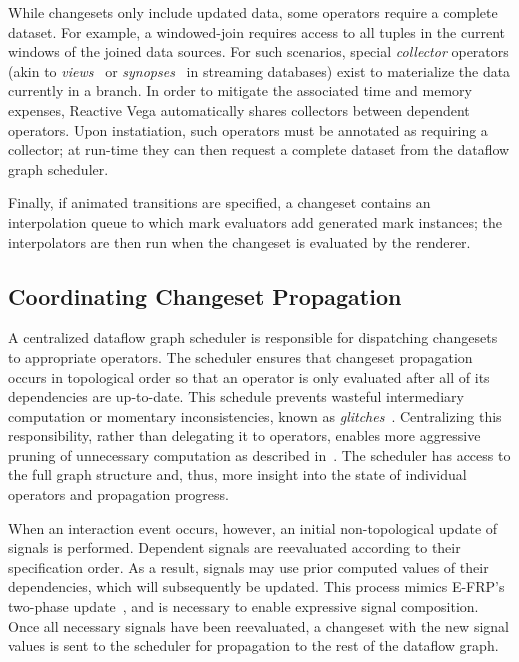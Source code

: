 While changesets only include updated data, some operators require a complete
dataset. For example, a windowed-join requires access to all tuples in the
current windows of the joined data sources. For such scenarios, special
\emph{collector} operators (akin to \emph{views}~\cite{abadi:aurora} or
\emph{synopses}~\cite{arasu:stream} in streaming databases) exist to
materialize the data currently in a branch. In order to mitigate the
associated time and memory expenses, Reactive Vega automatically shares
collectors between dependent operators. Upon instatiation, such operators must
be annotated as requiring a collector; at run-time they can then request a
complete dataset from the dataflow graph scheduler.

Finally, if animated transitions are specified, a changeset contains an
interpolation queue to which mark evaluators add generated mark instances; the
interpolators are then run when the changeset is evaluated by the renderer.

\subsection{Coordinating Changeset Propagation}
\label{sec:propagation}

A centralized dataflow graph scheduler is responsible for dispatching changesets
to appropriate operators. The scheduler ensures that changeset propagation
occurs in topological order so that an operator is only evaluated after all of
its dependencies are up-to-date. This schedule prevents wasteful intermediary
computation or momentary inconsistencies, known as
\emph{glitches}~\cite{cooper:embedding}. Centralizing this responsibility,
rather than delegating it to operators, enables more aggressive pruning of
unnecessary computation as described in~. The scheduler has
access to the full graph structure and, thus, more insight into the state of
individual operators and propagation progress.

When an interaction event occurs, however, an initial non-topological update of
signals is performed. Dependent signals are reevaluated according to their
specification order. As a result, signals may use prior computed values of their
dependencies, which will subsequently be updated. This process mimics E-FRP's
two-phase update~\cite{wan:efrp}, and is necessary to enable expressive signal
composition. Once all necessary signals have been reevaluated, a changeset with
the new signal values is sent to the scheduler for propagation to the rest of
the dataflow graph.

